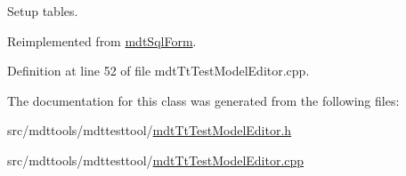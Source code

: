 Setup tables. 



Reimplemented from \hyperlink{classmdt_sql_form_a27fe6e45aa5d4d7782aad9833e6de20b}{mdt\-Sql\-Form}.



Definition at line 52 of file mdt\-Tt\-Test\-Model\-Editor.\-cpp.



The documentation for this class was generated from the following files\-:\begin{DoxyCompactItemize}
\item 
src/mdttools/mdttesttool/\hyperlink{mdt_tt_test_model_editor_8h}{mdt\-Tt\-Test\-Model\-Editor.\-h}\item 
src/mdttools/mdttesttool/\hyperlink{mdt_tt_test_model_editor_8cpp}{mdt\-Tt\-Test\-Model\-Editor.\-cpp}\end{DoxyCompactItemize}
